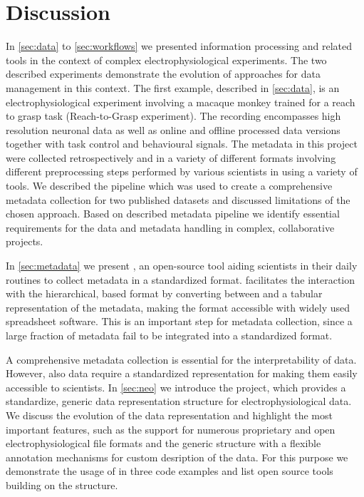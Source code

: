 \clearpage
\chapter{Discussion}
\label{sec:discussion}




In \cref{sec:data} to \cref{sec:workflows} we presented information processing and related tools in the context of complex electrophysiological experiments. The two described experiments demonstrate the evolution of approaches for data management in this context. The first example, described in \cref{sec:data}, is an electrophysiological experiment involving a macaque monkey trained for a reach to grasp task (Reach-to-Grasp experiment). The recording encompasses high resolution neuronal data as well as online and offline processed data versions together with task control and behavioural signals. The metadata in this project were collected retrospectively and in a variety of different formats involving different preprocessing steps performed by various scientists in using a variety of tools. We described the pipeline which was used to create a comprehensive metadata collection for two published datasets and discussed limitations of the chosen approach. Based on described metadata pipeline we identify essential requirements for the data and metadata handling in complex, collaborative projects.

In \cref{sec:metadata} we present , an open-source tool aiding scientists in their daily routines to collect metadata in a standardized format.  facilitates the interaction with the hierarchical,  based  format by converting between  and a tabular representation of the metadata, making the  format accessible with widely used spreadsheet software. This is an important step for metadata collection, since a large fraction of metadata fail to be integrated into a standardized format.

A comprehensive metadata collection is essential for the interpretability of data. However, also data require a standardized representation for making them easily accessible to scientists. In \cref{sec:neo} we introduce the  project, which provides a standardize, generic data representation structure for electrophysiological data. We discuss the evolution of the  data representation and highlight the most important features, such as the support for numerous proprietary and open electrophysiological file formats and the generic structure with a flexible annotation mechanisms for custom desription of the data. For this purpose we demonstrate the usage of  in three code examples and list open source tools building on the  structure.

